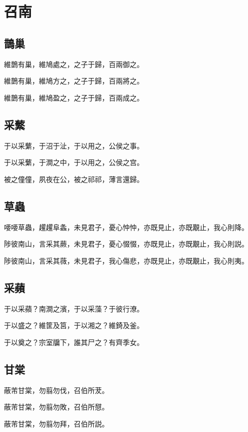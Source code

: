 \section[召南]{召南}

\subsection[鵲巢]{鵲巢}

維鵲有巢，維鳩處之，之子于歸，百兩御之。

維鵲有巢，維鳩方之，之子于歸，百兩將之。

維鵲有巢，維鳩盈之，之子于歸，百兩成之。

\subsection[采蘩]{采蘩}

于以采蘩，于沼于沚，于以用之，公侯之事。

于以采蘩，于澗之中，于以用之，公侯之宫。

被之僮僮，夙夜在公，被之祁祁，薄言還歸。

\subsection[草蟲]{草蟲}

喓喓草蟲，趯趯阜螽，未見君子，憂心忡忡，亦既見止，亦既覯止，我心則降。

陟彼南山，言采其蕨，未見君子，憂心惙惙，亦既見止，亦既覯止，我心則説。

陟彼南山，言采其薇，未見君子，我心傷悲，亦既見止，亦既覯止，我心則夷。

\subsection[采蘋]{采蘋}

于以采蘋？南澗之濱，于以采藻？于彼行潦。

于以盛之？維筐及筥，于以湘之？維錡及釜。

于以奠之？宗室牖下，誰其尸之？有齊季女。

\subsection[甘棠]{甘棠}

蔽芾甘棠，勿翦勿伐，召伯所茇。

蔽芾甘棠，勿翦勿敗，召伯所憇。

蔽芾甘棠，勿翦勿拜，召伯所説。

